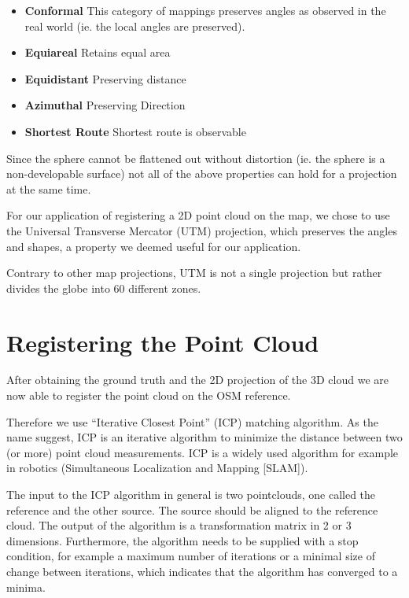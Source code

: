 \documentclass[10pt,twocolumn,letterpaper]{article}
\begin{document}
\begin{itemize}
   \item \textbf{Conformal} This category of mappings preserves angles as observed in the real world (ie. the local angles are preserved). 
   \item \textbf{Equiareal} Retains equal area
   \item \textbf{Equidistant} Preserving distance
   \item \textbf{Azimuthal} Preserving Direction
   \item \textbf{Shortest Route} Shortest route is observable 
\end{itemize}

Since the sphere cannot be flattened out without distortion (ie. the sphere is a non-developable surface) not all of the above properties can hold for a projection at the same time.

For our application of registering a 2D point cloud on the map, we chose to use the Universal Transverse Mercator (UTM) projection, which preserves the angles and shapes, a property we deemed useful for our application.

Contrary to other map projections, UTM is not a single projection but rather divides the globe into 60 different zones.

\section{Registering the Point Cloud}

After obtaining the ground truth and the 2D projection of the 3D cloud we are now able to register the point cloud on the OSM reference.

Therefore we use ``Iterative Closest Point'' (ICP) matching algorithm. As the name suggest, ICP is an iterative algorithm to minimize the distance between two (or more) point cloud measurements. ICP is a widely used algorithm for example in robotics (Simultaneous Localization and Mapping [SLAM]). 

The input to the ICP algorithm in general is two pointclouds, one called the reference and the other source. The source should be aligned to the reference cloud. The output of the algorithm is a transformation matrix in 2 or 3 dimensions. Furthermore, the algorithm needs to be supplied with a stop condition, for example a maximum number of iterations or a minimal size of change between iterations, which indicates that the algorithm has converged to a minima.
\end{document}
